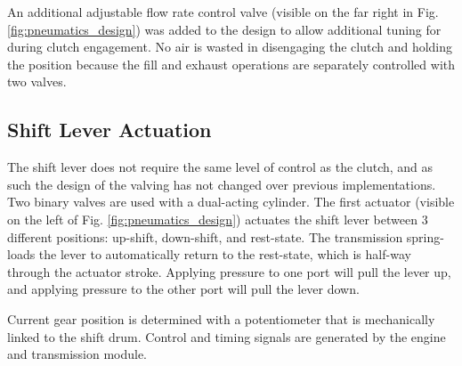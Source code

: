 An additional adjustable flow rate control valve (visible on the far right in Fig. \ref{fig:pneumatics_design}) was added to the design to allow additional tuning for during clutch engagement. No air is wasted in disengaging the clutch and holding the position because the fill and exhaust operations are separately controlled with two valves.

\subsection{Shift Lever Actuation}

The shift lever does not require the same level of control as the clutch, and as such the design of the valving has not changed over previous implementations. Two binary valves are used with a dual-acting cylinder. The first actuator (visible on the left of Fig. \ref{fig:pneumatics_design}) actuates the shift lever between 3 different positions: up-shift, down-shift, and rest-state. The transmission spring-loads the lever to automatically return to the rest-state, which is half-way through the actuator stroke. Applying pressure to one port will pull the lever up, and applying pressure to the other port will pull the lever down. 

Current gear position is determined with a potentiometer that is mechanically linked to the shift drum. Control and timing signals are generated by the engine and transmission module.

